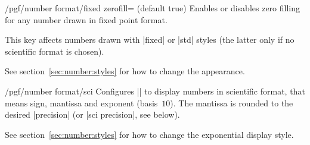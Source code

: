 \begin{key}{/pgf/number format/fixed zerofill=  (default true)}
    Enables or disables zero filling for any number drawn in fixed point
    format.
\begin{codeexample}[pre={\begin{lateximage}},post={\end{lateximage}}]
\hspace{1em}
\hspace{1em}
\hspace{1em}
\hspace{1em}
\end{codeexample}
    This key affects numbers drawn with |fixed| or |std| styles (the latter
    only if no scientific format is chosen).
\begin{codeexample}[pre={\begin{lateximage}},post={\end{lateximage}}]
\hspace{1em}
\hspace{1em}
\hspace{1em}
\end{codeexample}

    See section~\ref{sec:number:styles} for how to change the appearance.
\end{key}

\begin{key}{/pgf/number format/sci}
    Configures |\pgfmathprintnumber| to display numbers in scientific format,
    that means sign, mantissa and exponent (basis~$10$). The mantissa is
    rounded to the desired |precision| (or |sci precision|, see below).
\begin{codeexample}[pre={\begin{lateximage}},post={\end{lateximage}}]
\hspace{1em}
\hspace{1em}
\hspace{1em}
\hspace{1em}
\end{codeexample}

    See section~\ref{sec:number:styles} for how to change the exponential
    display style.
\end{key}

